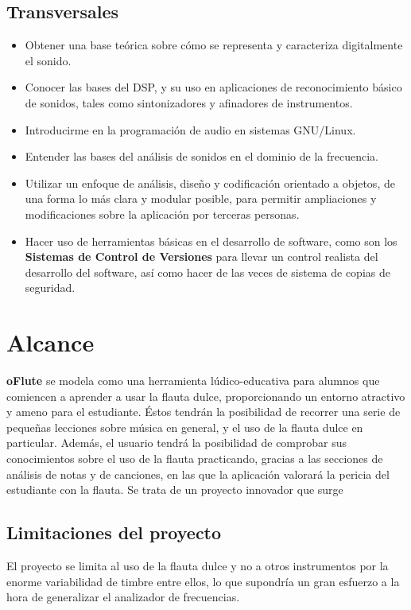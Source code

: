 \subsection{Transversales}
\begin{itemize}
\item Obtener una base teórica sobre cómo se representa y caracteriza
  digitalmente el sonido.
\item Conocer las bases del \ac{DSP}, y su uso en aplicaciones de
  reconocimiento básico de sonidos, tales como sintonizadores y
  afinadores de instrumentos.
\item Introducirme en la programación de audio en sistemas GNU/Linux.
\item Entender las bases del análisis de sonidos en el dominio de la
  frecuencia. 
\item Utilizar un enfoque de análisis, diseño y codificación orientado
  a objetos, de una forma lo más clara y modular posible, para
  permitir ampliaciones y modificaciones sobre la aplicación por
  terceras personas.
\item Hacer uso de herramientas básicas en el desarrollo de software,
  como son los \textbf{Sistemas de Control de Versiones} para llevar
  un control realista del desarrollo del software, así como hacer de
  las veces de sistema de copias de seguridad.
\end{itemize}


\section{Alcance}
\textbf{oFlute} se modela como una herramienta lúdico-educativa para
alumnos que comiencen a aprender a usar la flauta dulce,
proporcionando un entorno atractivo y ameno para el estudiante. Éstos
tendrán la posibilidad de recorrer una serie de pequeñas lecciones
sobre música en general, y el uso de la flauta dulce en
particular. Además, el usuario tendrá la posibilidad de comprobar sus
conocimientos sobre el uso de la flauta practicando, gracias a las
secciones de análisis de notas y de canciones, en las que la
aplicación valorará la pericia del estudiante con la flauta.
Se trata de un proyecto innovador que surge 

\subsection{Limitaciones del proyecto}
El proyecto se limita al uso de la flauta dulce y no a otros
instrumentos por la enorme variabilidad de timbre entre ellos, lo que
supondría un gran esfuerzo a la hora de generalizar el analizador de
frecuencias. 

